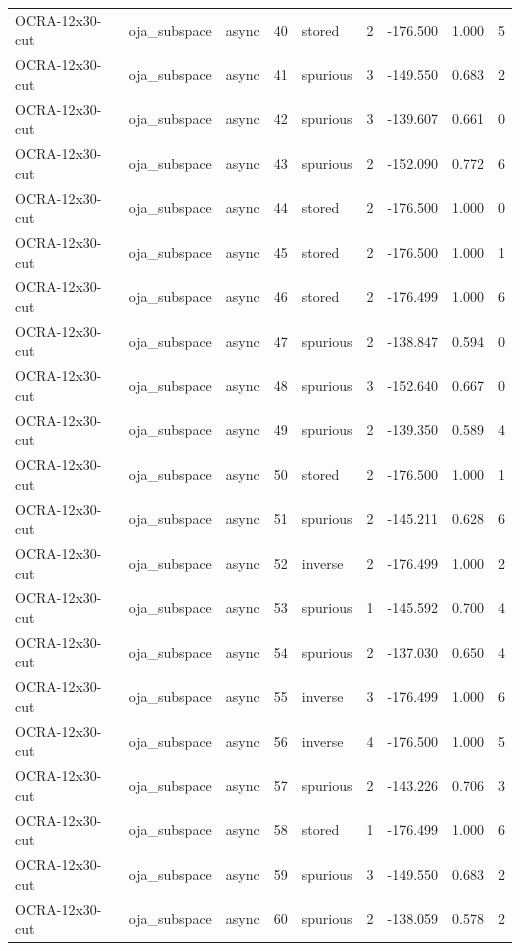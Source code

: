 \begin{tabular}{lllrlrrrr}
OCRA-12x30-cut & oja\_subspace & async & 40 & stored & 2 & -176.500 & 1.000 & 5 \\
OCRA-12x30-cut & oja\_subspace & async & 41 & spurious & 3 & -149.550 & 0.683 & 2 \\
OCRA-12x30-cut & oja\_subspace & async & 42 & spurious & 3 & -139.607 & 0.661 & 0 \\
OCRA-12x30-cut & oja\_subspace & async & 43 & spurious & 2 & -152.090 & 0.772 & 6 \\
OCRA-12x30-cut & oja\_subspace & async & 44 & stored & 2 & -176.500 & 1.000 & 0 \\
OCRA-12x30-cut & oja\_subspace & async & 45 & stored & 2 & -176.500 & 1.000 & 1 \\
OCRA-12x30-cut & oja\_subspace & async & 46 & stored & 2 & -176.499 & 1.000 & 6 \\
OCRA-12x30-cut & oja\_subspace & async & 47 & spurious & 2 & -138.847 & 0.594 & 0 \\
OCRA-12x30-cut & oja\_subspace & async & 48 & spurious & 3 & -152.640 & 0.667 & 0 \\
OCRA-12x30-cut & oja\_subspace & async & 49 & spurious & 2 & -139.350 & 0.589 & 4 \\
OCRA-12x30-cut & oja\_subspace & async & 50 & stored & 2 & -176.500 & 1.000 & 1 \\
OCRA-12x30-cut & oja\_subspace & async & 51 & spurious & 2 & -145.211 & 0.628 & 6 \\
OCRA-12x30-cut & oja\_subspace & async & 52 & inverse & 2 & -176.499 & 1.000 & 2 \\
OCRA-12x30-cut & oja\_subspace & async & 53 & spurious & 1 & -145.592 & 0.700 & 4 \\
OCRA-12x30-cut & oja\_subspace & async & 54 & spurious & 2 & -137.030 & 0.650 & 4 \\
OCRA-12x30-cut & oja\_subspace & async & 55 & inverse & 3 & -176.499 & 1.000 & 6 \\
OCRA-12x30-cut & oja\_subspace & async & 56 & inverse & 4 & -176.500 & 1.000 & 5 \\
OCRA-12x30-cut & oja\_subspace & async & 57 & spurious & 2 & -143.226 & 0.706 & 3 \\
OCRA-12x30-cut & oja\_subspace & async & 58 & stored & 1 & -176.499 & 1.000 & 6 \\
OCRA-12x30-cut & oja\_subspace & async & 59 & spurious & 3 & -149.550 & 0.683 & 2 \\
OCRA-12x30-cut & oja\_subspace & async & 60 & spurious & 2 & -138.059 & 0.578 & 2 \\

\end{tabular}
